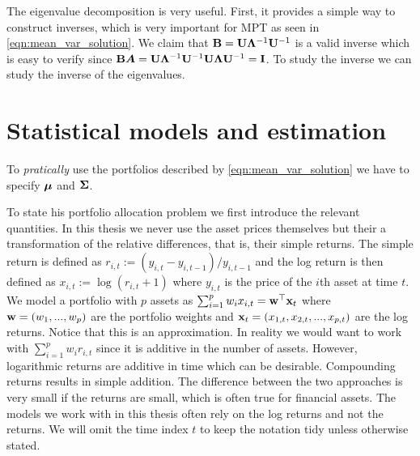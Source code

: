 \documentclass[]{book}\usepackage{knitr}
\begin{document}
The eigenvalue decomposition is very useful.
First, it provides a simple way to construct inverses, which is very important for MPT as seen in \eqref{eqn:mean_var_solution}.
We claim that $\mathbf{B} = \mathbf{U} \boldsymbol{\Lambda}^{-1} \mathbf{U}^{-1}$ is a valid inverse which is easy to verify since $\mathbf{B} \mbox{\boldmath$A$} = \mathbf{U} \boldsymbol{\Lambda}^{-1} \mathbf{U}^{-1} \mathbf{U} \boldsymbol{\Lambda} \mathbf{U}^{-1} = \mathbf{I}$. 
To study the inverse we can study the inverse of the eigenvalues.
\chapter{Statistical models and estimation}\label{ch:estim}

To \textit{pratically} use the portfolios described by \eqref{eqn:mean_var_solution} we have to specify $\mbox{\boldmath$\mu$}$ and $\mathbf{\Sigma}$.


To state his portfolio allocation problem we first introduce the relevant quantities. In this thesis we never use the asset prices themselves but their a transformation of the relative differences, that is, their simple returns. The simple return is defined as $r_{i,t} := (y_{i,t}-y_{i,t-1})/y_{i,t-1}$ and the log return is then defined as
$
x_{i,t} := \log(r_{i,t} + 1)
$
where $y_{i,t}$ is the price of the $i$th asset at time $t$. We model a portfolio with $p$ assets as $\sum_{i=1}^p w_i x_{i,t} = \mathbf{w}^\top \mathbf{x}_t$ where $\mathbf{w}=(w_1, ..., w_p)$ are the portfolio weights and $\mathbf{x}_t=(x_{1,t},x_{2,t},..., x_{p,t})$ are the log returns. Notice that this is an approximation. In reality we would want to work with $\sum_{i=1}^p w_i r_{i,t}$ since it is additive in the number of assets. However, logarithmic returns are additive in time which can be desirable. Compounding returns results in simple addition. The difference between the two approaches is very small if the returns are small, which is often true for financial assets. The models we work with in this thesis often rely on the log returns and not the returns. We will omit the time index $t$ to keep the notation tidy unless otherwise stated. 
\end{document}

